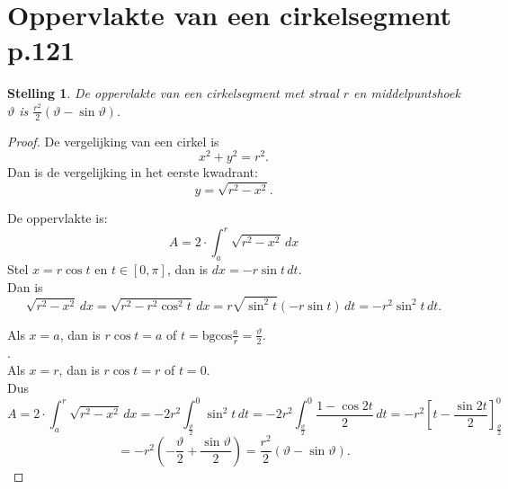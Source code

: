 \documentclass{article}
\newtheorem*{Stelling}{Stelling}
\begin{document}
\section{Oppervlakte van een cirkelsegment p.121}
\begin{Stelling}
De oppervlakte van een cirkelsegment met straal $r$ en middelpuntshoek $\vartheta$ is $\frac{r^2}{2}\left(\vartheta-\sin\vartheta\right).$
\end{Stelling}
\begin{proof}
De vergelijking van een cirkel is $$x^2+y^2=r^2.$$
Dan is de vergelijking in het eerste kwadrant:
$$y=\sqrt{r^2-x^2}.$$
De oppervlakte is: $$A = 2\cdot \int_a^r \sqrt{r^2-x^2}\,dx$$
Stel $x=r\cos t$ en $t\in\left[0,\pi\right]$, dan is $dx =-r\sin t\, dt$. \\
Dan is $$\sqrt{r^2-x^2}\,dx = \sqrt{r^2-r^2\cos^2t}\, dx=r\sqrt{\sin^2t}\left(-r\sin t\right)\,dt = -r^2\sin^2t\,dt.$$

Als $x=a$, dan is $r\cos t = a$ of $t=\text{bgcos}\frac{a}{r} = \frac{\vartheta}{2}$.\\.\\
Als $x=r$, dan is $r\cos t = r$ of $t=0$.\\
Dus $$A = 2\cdot\int_a^r \sqrt{r^2-x^2}\, dx =-2r^2\int_\frac{\vartheta}{2}^0\sin^2t\,dt = -2r^2\int_\frac{\vartheta}{2}^0 \frac{1-\cos2t}{2}\,dt = -r^2\left[t - \frac{\sin2t}{2}\right]_\frac{\vartheta}{2}^0$$ $$=-r^2\left(-\frac{\vartheta}{2}+\frac{\sin\vartheta}{2}\right) = \frac{r^2}{2}\left(\vartheta-\sin\vartheta\right).$$
\end{proof}
\end{document}
